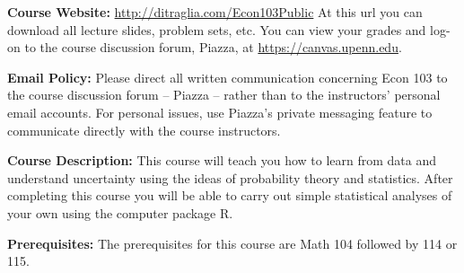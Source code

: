 \documentclass[11pt, letterpaper]{article}
\begin{document}




\medskip
 
\noindent \textbf{Course Website:} \url{http://ditraglia.com/Econ103Public} At this url you can 
download all lecture slides, problem sets, etc.
You can view your grades and log-on to the course discussion forum, Piazza, at \url{https://canvas.upenn.edu}.

\medskip

\noindent \textbf{Email Policy:}
Please direct all written communication concerning Econ 103 to the course discussion forum -- Piazza -- rather than to the instructors' personal email accounts.
For personal issues, use Piazza's private messaging feature to communicate directly with the course instructors. 

\medskip



\noindent \textbf{Course Description:} 
This course will teach you how to learn from data and understand uncertainty using the ideas of probability theory and statistics. 
After completing this course you will be able to carry out simple statistical analyses of your own using the computer package R.


\medskip


\noindent \textbf{Prerequisites:} 
The prerequisites for this course are Math 104 followed by 114 or 115. 
\end{document}
